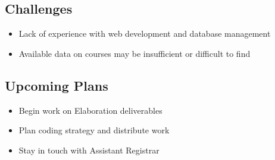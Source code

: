 \documentclass[11pt]{article}
\begin{document}
\subsection{Challenges} %
\begin{itemize}
\item Lack of experience with web development and database management
\item Available data on courses may be insufficient or difficult to find
\end{itemize}

\subsection{Upcoming Plans}
\begin{itemize}
\item Begin work on Elaboration deliverables
\item Plan coding strategy and distribute work
\item Stay in touch with Assistant Registrar
\end{itemize}
\end{document}
